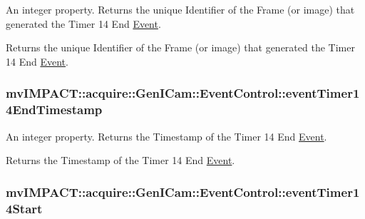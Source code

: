 An integer property. Returns the unique Identifier of the Frame (or image) that generated the Timer 14 End \hyperlink{classmv_i_m_p_a_c_t_1_1acquire_1_1_event}{Event}. 

Returns the unique Identifier of the Frame (or image) that generated the Timer 14 End \hyperlink{classmv_i_m_p_a_c_t_1_1acquire_1_1_event}{Event}. \hypertarget{classmv_i_m_p_a_c_t_1_1acquire_1_1_gen_i_cam_1_1_event_control_a84c0f0d57add6233ec8418783538e37e}{
\subsubsection[{event\+Timer14\+End\+Timestamp}]{ mv\+I\+M\+P\+A\+C\+T\+::acquire\+::\+Gen\+I\+Cam\+::\+Event\+Control\+::event\+Timer14\+End\+Timestamp}}\label{classmv_i_m_p_a_c_t_1_1acquire_1_1_gen_i_cam_1_1_event_control_a84c0f0d57add6233ec8418783538e37e}


An integer property. Returns the Timestamp of the Timer 14 End \hyperlink{classmv_i_m_p_a_c_t_1_1acquire_1_1_event}{Event}. 

Returns the Timestamp of the Timer 14 End \hyperlink{classmv_i_m_p_a_c_t_1_1acquire_1_1_event}{Event}. \hypertarget{classmv_i_m_p_a_c_t_1_1acquire_1_1_gen_i_cam_1_1_event_control_a7605be827fe6c1e4519132883fae639c}{
\subsubsection[{event\+Timer14\+Start}]{ mv\+I\+M\+P\+A\+C\+T\+::acquire\+::\+Gen\+I\+Cam\+::\+Event\+Control\+::event\+Timer14\+Start}}\label{classmv_i_m_p_a_c_t_1_1acquire_1_1_gen_i_cam_1_1_event_control_a7605be827fe6c1e4519132883fae639c}


